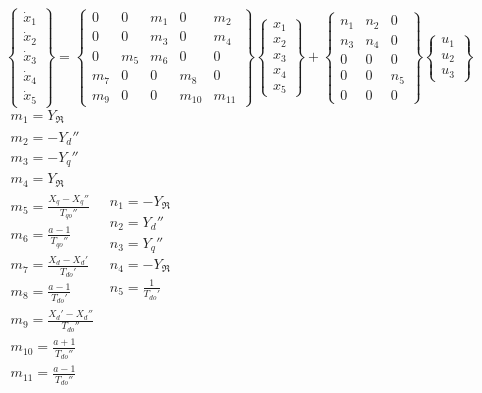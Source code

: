 \documentclass[letterpaper]{article}
\begin{document}
$\left\{\begin{matrix}\dot{x}_{1}\\\dot{x}_{2}\\\dot{x}_{3}\\\dot{x}_{4}\\\dot{x}_{5}\end{matrix}\right\}=\left\{\begin{matrix}0&0&m_{1}&0&m_{2}\\0&0&m_{3}&0&m_{4}\\0&m_{5}&m_{6}&0&0\\m_{7}&0&0&m_{8}&0\\m_{9}&0&0&m_{10}&m_{11}\end{matrix}\right\}\left\{\begin{matrix}x_{1}\\x_{2}\\x_{3}\\x_{4}\\x_{5}\end{matrix}\right\}+\left\{\begin{matrix}n_{1}&n_{2}&0\\n_{3}&n_{4}&0\\0&0&0\\0&0&n_{5}\\0&0&0\end{matrix}\right\}\left\{\begin{matrix}u_{1}\\u_{2}\\u_{3}\end{matrix}\right\}$
$\begin{gathered}m_{1}=Y_{\Re
}\\m_{2}=-Y_{d}''\\m_{3}=-Y_{q}''\\m_{4}=Y_{\Re
}\\m_{5}=\frac{X_{q}-X_{q}''}{T_{\mathit{qo}}''}\\m_{6}=\frac{a-1}{T_{\mathit{qo}}''}\\m_{7}=\frac{X_{d}-X_{d}'}{T_{\mathit{do}}'}\\m_{8}=\frac{a-1}{T_{\mathit{do}}'}\\m_{9}=\frac{X_{d}'-X_{d}''}{T_{\mathit{do}}''}\\m_{10}=\frac{a+1}{T_{\mathit{do}}''}\\m_{11}=\frac{a-1}{T_{\mathit{do}}''}\end{gathered}$
$\begin{gathered}n_{1}=-Y_{\Re
}\\n_{2}=Y_{d}''\\n_{3}=Y_{q}''\\n_{4}=-Y_{\Re
}\\n_{5}=\frac{1}{T_{\mathit{do}}'}\end{gathered}$
\end{document}

